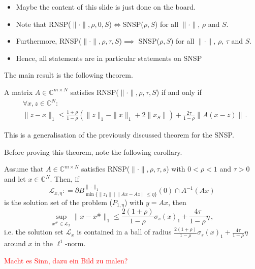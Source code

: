 \documentclass[11pt]{beamer}
\newcommand{\CC}{\mathbb{C}}
\newcommand{\pp}{\partial}
\begin{document}
\begin{frame}
	\begin{itemize}
		\item Maybe the content of this slide is just done on the board.
		\item Note that RNSP($\|\cdot\|,\rho,0,S$)$\iff$SNSP($\rho,S$) for all \(\|\cdot\|\), \(\rho\) and \(S\).
		\item Furthermore, RNSP($\|\cdot\|,\rho,\tau,S$)$\implies$ SNSP($\rho,S$) for all \(\|\cdot\|\), \(\rho\), \(\tau\) and \(S\).
\item Hence, all statements are in particular statements on SNSP
	\end{itemize}
\end{frame}

\begin{frame}{}
    The main result is the following theorem.
    \begin{Satzz}
    {}{}
    A matrix \(A\in\CC^{m\times N}\) satisfies RNSP(\(\|\cdot\|,\rho,\tau,S\)) if and only if 
    \begin{align*}
    &\forall x,z\in \CC^N:\\ &\|z-x\|_1\le \frac{1+\rho}{1-\rho}(\|z\|_1-\|x\|_1+2\|x_S\|)+\frac{2\tau}{1-\rho}\|A(x-z)\|\,.
    \end{align*}
    \end{Satzz}
    This is a generalisation of the previously discussed theorem for the SNSP.

\end{frame}

\begin{frame}{}
Before proving this theorem, note the following corollary.
    \begin{Kor}
        {}{}
        Assume that \(A\in\CC^{m\times N}\) satisfies RNSP(\(\|\cdot\|,\rho,\tau,s\)) with \(0<\rho<1\) and \(\tau>0\) and let \(x\in \CC^N\). Then, if
        \[\mathcal L_{x,\eta}:
        =\pp B_{\min\{\|z_1\|\,|\,\|Ax-Az\|\le \eta\}}^{\|\cdot\|_1}(0)\cap A^{-1}(Ax)
        \]
        is the solution set of the problem ($P_{1,\eta}$) with \(y=Ax\), then 
        \[\sup_{x^{\#}\in \mathcal L_x}\|x-x^{\#}\|_1\le \frac{2(1+\rho)}{1-\rho}\sigma_s(x)_1+\frac{4\tau}{1-\rho}\eta\,,\]
        i.e. the solution set \(\mathcal L_x\) is contained in a ball of radius \(\frac{2(1+\rho)}{1-\rho}\sigma_s(x)_1+\frac{4\tau}{1-\rho}\eta\) around \(x\) in the \(\ell^1\)-norm.
    \end{Kor}
    \textcolor{red}{Macht es Sinn, dazu ein Bild zu malen?}
\end{frame}
\end{document}
